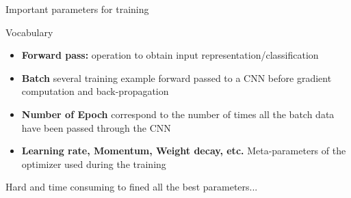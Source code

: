 \begin{frame}{Important parameters for training}

	\begin{block}{Vocabulary}
        \begin{itemize}
        	\item \textbf{Forward pass:} operation to obtain input representation/classification
        	\item \textbf{Batch} several training example forward passed to a CNN before gradient computation and back-propagation
        	\item \textbf{Number of Epoch} correspond to the number of times all the batch data have been passed through the CNN
        	\item \textbf{Learning rate, Momentum, Weight decay, etc.} Meta-parameters of the optimizer used during the training
        \end{itemize}
	\end{block}	
	\vfill
	Hard and time consuming to fined all the best parameters...
\end{frame}